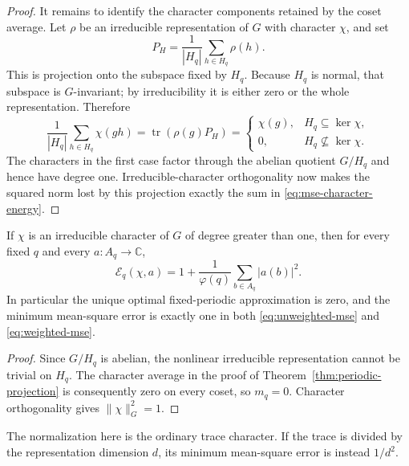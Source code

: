\begin{proof}
It remains to identify the character components retained by the coset
average. Let $\rho$ be an irreducible representation of $G$ with character
$\chi$, and set
\[
 P_H=\frac1{|H_q|}\sum_{h\in H_q}\rho(h).
\]
This is projection onto the subspace fixed by $H_q$. Because $H_q$ is
normal, that subspace is $G$-invariant; by irreducibility it is either
zero or the whole representation. Therefore
\[
 \frac1{|H_q|}\sum_{h\in H_q}\chi(gh)
 =\operatorname{tr}(\rho(g)P_H)
 =\begin{cases}
   \chi(g),&H_q\subseteq\ker\chi,\\
   0,&H_q\not\subseteq\ker\chi.
  \end{cases}
\]
The characters in the first case factor through the abelian quotient
$G/H_q$ and hence have degree one. Irreducible-character orthogonality
now makes the squared norm lost by this projection exactly the sum in
\eqref{eq:mse-character-energy}.
\end{proof}

\begin{corollary}
\label{cor:nonlinear-periodic}
If $\chi$ is an irreducible character of $G$ of degree greater than one,
then for every fixed $q$ and every $a:A_q\to\mathbb C$,
\begin{equation}\label{eq:nonlinear-mse}
 \mathcal E_q(\chi,a)
 =1+\frac1{\varphi(q)}\sum_{b\in A_q}|a(b)|^2.
\end{equation}
In particular the unique optimal fixed-periodic approximation is zero,
and the minimum mean-square error is exactly one in both
\eqref{eq:unweighted-mse} and \eqref{eq:weighted-mse}.
\end{corollary}

\begin{proof}
Since $G/H_q$ is abelian, the nonlinear irreducible representation cannot
be trivial on $H_q$. The character average in the proof of
Theorem~\ref{thm:periodic-projection} is consequently zero on every coset,
so $m_q=0$. Character orthogonality gives $\|\chi\|_G^2=1$.
\end{proof}

The normalization here is the ordinary trace character. If the trace is
divided by the representation dimension $d$, its minimum mean-square
error is instead $1/d^2$.

